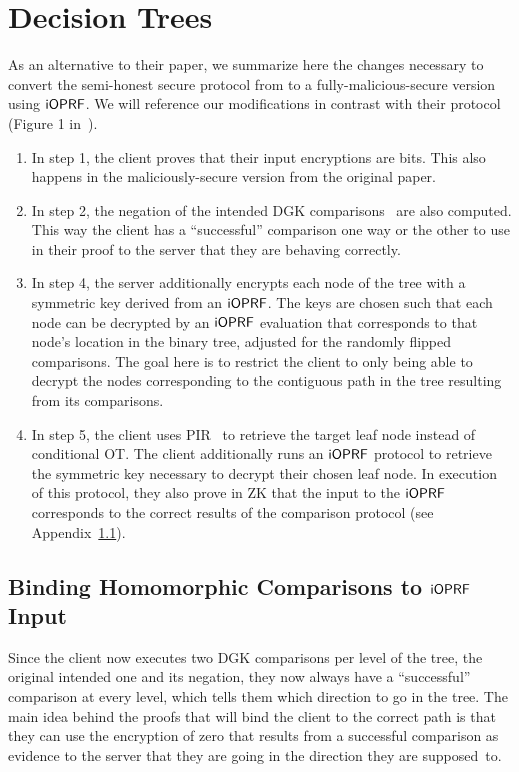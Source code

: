 \section{Decision Trees}
\label{app:dtrees}
As an alternative to their paper, we summarize here the changes
necessary to convert the semi-honest secure protocol from
\citeauthor{wu2016privately} to a fully-malicious-secure version using
$\mathsf{i}\mathsf{OPRF}$.  We will reference our modifications in contrast with their
protocol (Figure 1 in~\cite{wu2016privately}).

\begin{enumerate}
    \item In step 1, the client proves that their input encryptions
    are bits.  This also happens in the maliciously-secure version
    from the original paper.
    
    \item In step 2, the negation of the intended DGK
      comparisons~\cite{dgk} are also computed.  This way the client
      has a ``successful'' comparison one way or the other to use in
      their proof to the server that they are behaving correctly.
    
    \item In step 4, the server additionally encrypts each node of the
    tree with a symmetric key derived from an $\mathsf{i}\mathsf{OPRF}$.  The keys are
    chosen such that each node can be decrypted by an $\mathsf{i}\mathsf{OPRF}$
    evaluation that corresponds to that node's location in the binary
    tree, adjusted for the randomly flipped comparisons.  The goal
    here is to restrict the client to only being able to decrypt the
    nodes corresponding to the contiguous path in the tree resulting
    from its comparisons.

  \item In step 5, the client uses PIR~\cite{chang2004single} to
    retrieve the target leaf node instead of conditional OT.  The
    client additionally runs an $\mathsf{i}\mathsf{OPRF}$ protocol to retrieve the
    symmetric key necessary to decrypt their chosen leaf node.  In
    execution of this protocol, they also prove in ZK that
    the input to the $\mathsf{i}\mathsf{OPRF}$ corresponds to the correct results of
    the comparison protocol (see Appendix~\ref{app:zkp}).
\end{enumerate}

\subsection{Binding Homomorphic Comparisons to $\mathsf{i}\mathsf{OPRF}$ Input}
\label{app:zkp}
Since the client now executes two DGK comparisons per level of the
tree, the original intended one and its negation, they now always have
a ``successful'' comparison at every level, which tells them which
direction to go in the tree.  The main idea behind the proofs that
will bind the client to the correct path is that they can use the
encryption of zero that results from a successful comparison as
evidence to the server that they are going in the direction they are
supposed~to.

